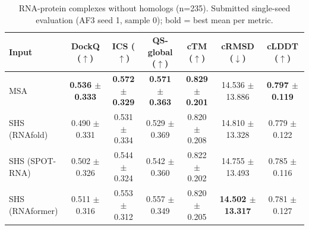 \begin{table}[htbp]
\centering
\caption{RNA-protein complexes without homologs (n=235). Submitted single-seed evaluation (AF3 seed 1, sample 0); bold = best mean per metric.}
\label{tab:rna_protein_complexes_without_homologs}
\begin{tabular}{lcccccc}
\toprule
Input & DockQ ($\uparrow$) & ICS ($\uparrow$) & QS-global ($\uparrow$) & cTM ($\uparrow$) & cRMSD ($\downarrow$) & cLDDT ($\uparrow$) \\
\midrule
MSA & \textbf{0.536 $\pm$ 0.333} & \textbf{0.572 $\pm$ 0.329} & \textbf{0.571 $\pm$ 0.363} & \textbf{0.829 $\pm$ 0.201} & 14.536 $\pm$ 13.886 & \textbf{0.797 $\pm$ 0.119} \\
SHS (RNAfold) & 0.490 $\pm$ 0.331 & 0.531 $\pm$ 0.334 & 0.529 $\pm$ 0.369 & 0.820 $\pm$ 0.208 & 14.810 $\pm$ 13.328 & 0.779 $\pm$ 0.122 \\
SHS (SPOT-RNA) & 0.502 $\pm$ 0.326 & 0.544 $\pm$ 0.324 & 0.542 $\pm$ 0.360 & 0.822 $\pm$ 0.202 & 14.755 $\pm$ 13.493 & 0.785 $\pm$ 0.116 \\
SHS (RNAformer) & 0.511 $\pm$ 0.316 & 0.553 $\pm$ 0.312 & 0.557 $\pm$ 0.349 & 0.820 $\pm$ 0.205 & \textbf{14.502 $\pm$ 13.317} & 0.781 $\pm$ 0.127 \\
\bottomrule
\end{tabular}
\end{table}
